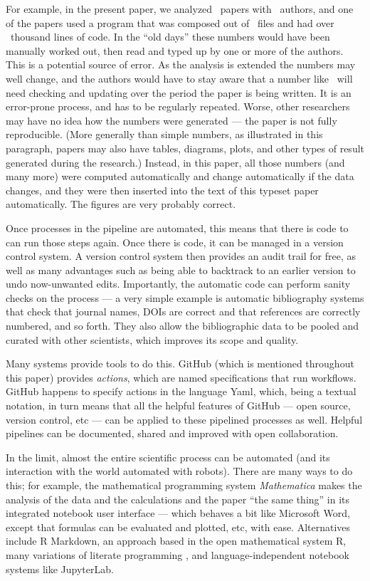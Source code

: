 \documentclass{comjnl}
\begin{document}
For example, in the present paper, we analyzed \the\dataN\ papers with \the\countAuthors\ authors, and one of the papers used a program that was composed out of \covidsimfiles\ files and had over \covidsimkLOC\ thousand lines of code. In the ``old days'' these numbers would have been manually worked out, then read and typed up by one or more of the authors. This is a potential source of error. As the analysis is extended the numbers may well change, and the authors would have to stay aware that a number like \the\dataN\ will need checking and updating over the period the paper is being written. It is an error-prone process, and has to be regularly repeated. Worse, other researchers may have no idea how the numbers were generated --- the paper is not fully reproducible. (More generally than simple numbers, as illustrated in this paragraph, papers may also have tables, diagrams, plots, and other types of result generated during the research.) Instead, in this paper, all those numbers (and many more) were computed automatically and change automatically if the data changes, and they were then inserted into the text of this typeset paper automatically. The figures are very probably correct.

Once processes in the pipeline are automated, this means that there is code to can run those steps again. Once there is code, it can be managed in a version control system. A version control system then provides an audit trail for free, as well as many advantages such as being able to backtrack to an earlier version to undo now-unwanted edits. Importantly, the automatic code can perform sanity checks on the process --- a very simple example is automatic bibliography systems that check that journal names, DOIs are correct and that references are correctly numbered, and so forth. They also allow the bibliographic data to be pooled and curated with other scientists, which improves its scope and quality.

Many systems provide tools to do this. GitHub (which is mentioned throughout this paper) provides \emph{actions\/}, which are named specifications that run workflows. GitHub happens to specify actions in the language Yaml, which, being a textual notation, in turn means that all the helpful features of GitHub --- open source, version control, etc --- can be applied to these pipelined processes as well. Helpful pipelines can be documented, shared and improved with open collaboration.

In the limit, almost the entire scientific process can be automated (and its interaction with the world automated with robots). There are many ways to do this; for example, the mathematical programming system \emph{Mathematica\/} makes the analysis of the data and the calculations and the paper ``the same thing'' in its integrated notebook user interface --- which behaves a bit like Microsoft Word, except that formulas can be evaluated and plotted, etc, with ease. Alternatives include R Markdown, an approach based in the open mathematical system R, many variations of literate programming \cite{relit}, and language-independent notebook systems like JupyterLab.
\end{document}
